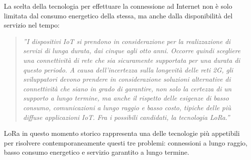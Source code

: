 \documentclass[a4paper]{report} %
\begin{document}
La scelta della tecnologia per effettuare la connessione ad Internet non è solo limitata dal consumo energetico della stessa, ma anche dalla disponibilità del servizio nel tempo: 
\begin{quote}
	\textit{''I dispositivi IoT si prendono in considerazione per la realizzazione di servizi di lunga durata, dai cinque agli otto anni. Occorre quindi scegliere una connettività di rete che sia sicuramente supportata per una durata di questo periodo. A causa dell'incertezza sulla longevità delle reti 2G, gli sviluppatori devono prendere in considerazione soluzioni alternative di connettività che siano in grado di garantire, non solo la certezza di un supporto a lungo termine, ma anche il rispetto delle esigenze di basso consumo, comunicazioni a lungo raggio e basso costo, tipiche delle più diffuse applicazioni IoT. Fra i possibili candidati, la tecnologia LoRa.''}
\end{quote}
LoRa in questo momento storico rappresenta una delle tecnologie più appetibili per risolvere contemporaneamente questi tre problemi: connessioni a lungo raggio, basso consumo energetico e servizio garantito a lungo termine.
\end{document}
